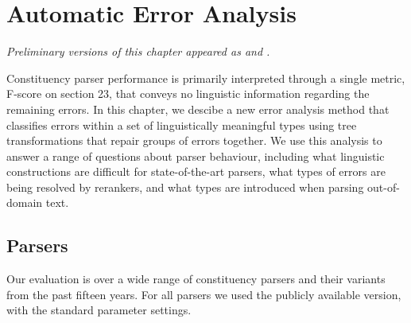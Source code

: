 \chapter{Automatic Error Analysis} \label{chp:analysis}

\begin{center}
\textit{
  Preliminary versions of this chapter appeared as \textcite{Kummerfeld-etal:2012:EMNLP} and \textcite{Kummerfeld-etal:2013:ACL}.
}
\end{center}

Constituency parser performance is primarily interpreted through a single metric, F-score on \wsj section 23, that conveys no linguistic information regarding the remaining errors.
In this chapter, we descibe a new error analysis method that classifies errors within a set of linguistically meaningful types using tree transformations that repair groups of errors together.
We use this analysis to answer a range of questions about parser behaviour, including what linguistic constructions are difficult for state-of-the-art parsers, what types of errors are being resolved by rerankers, and what types are introduced when parsing out-of-domain text.


\section{Parsers}

Our evaluation is over a wide range of \ptb constituency parsers and their variants from the past fifteen years.
For all parsers we used the publicly available version, with the standard parameter settings.

